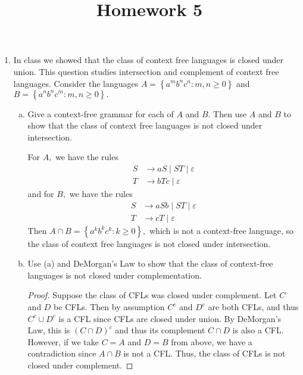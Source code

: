 \documentclass{article}
\begin{document}
\title{Homework 5}
\maketitle
\thispagestyle{fancy}

\begin{enumerate}
	\item In class we showed that the class of context free languages is closed under union. This question studies intersection and complement of context free languages. Consider the languages $A=\left\{ a^mb^nc^n:m, n\ge 0 \right\}$ and $B=\left\{ a^nb^nc^m:m, n\ge 0 \right\}.$
		\begin{enumerate}[(a)]
			\item Give a context-free grammar for each of $A$ and $B.$ Then use $A$ and $B$ to show that the class of context free languages is not closed under intersection.
				\begin{soln}
					For $A,$ we have the rules
					\begin{align*}
						S &\to aS\mid ST\mid \varepsilon \\
						T &\to bTc\mid \varepsilon
					\end{align*}
					and for $B,$ we have the rules
					\begin{align*}
						S &\to aSb\mid ST\mid \varepsilon \\
						T &\to cT \mid \varepsilon
					\end{align*}
					Then $A\cap B=\left\{ a^kb^kc^k:k\ge0 \right\},$ which is not a context-free language, so the class of context free languages is not closed under intersection.
				\end{soln}

			\item Use (a) and DeMorgan's Law to show that the class of context-free languages is not closed under complementation.
				\begin{proof}
					Suppose the class of CFLs was closed under complement. Let $C$ and $D$ be CFLs. Then by assumption $C^c$ and $D^c$ are both CFLs, and thus $C^c\cup D^c$ is a CFL since CFLs are closed under union. By DeMorgan's Law, this is $(C\cap D)^c$ and thus its complement $C\cap D$ is also a CFL. However, if we take $C=A$ and $D=B$ from above, we have a contradiction since $A\cap B$ is not a CFL. Thus, the class of CFLs is not closed under complement.
				\end{proof}
				
		\end{enumerate}


\end{enumerate}
\end{document}
